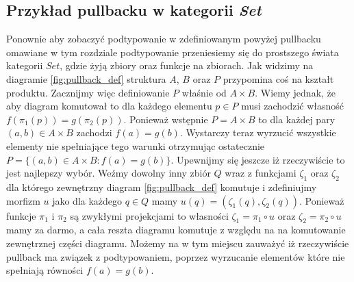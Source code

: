 \subsection{Przykład pullbacku w kategorii \emph{Set}}
Ponownie aby zobaczyć podtypowanie w zdefiniowanym powyżej pullbacku omawiane w tym rozdziale podtypowanie przeniesiemy się do prostszego świata kategorii $Set$, gdzie żyją zbiory oraz funkcje na zbiorach. Jak widzimy na diagramie \ref{fig:pullback_def} struktura $A$, $B$ oraz $P$ przypomina coś na kształt produktu. Zacznijmy więc definiowanie $P$ właśnie od $A \times B$. Wiemy jednak, że aby diagram komutował to dla każdego elementu $p \in P$ musi zachodzić własność $f (\pi_1 (p)) = g (\pi_2(p))$. Ponieważ wstępnie $P = A \times B$ to dla każdej pary $(a, b) \in A \times B$ zachodzi $f(a) = g(b)$. Wystarczy teraz wyrzucić wszystkie elementy nie spełniające tego warunki otrzymując ostatecznie $P = \{(a, b) \in A \times B : f(a) = g(b)\}$. Upewnijmy się jeszcze iż rzeczywiście to jest najlepszy wybór. Weźmy dowolny inny zbiór $Q$ wraz z funkcjami $\zeta_1$ oraz $\zeta_2$ dla którego zewnętrzny diagram \ref{fig:pullback_def} komutuje  i zdefiniujmy morfizm $u$ jako dla każdego $q \in Q$ mamy $u(q) = (\zeta_1(q), \zeta_2(q))$. Ponieważ funkcje $\pi_1$ i $\pi_2$ są zwykłymi projekcjami to własności $\zeta_1 = \pi_1 \circ u$ oraz $\zeta_2 = \pi_2 \circ u$ mamy za darmo, a cała reszta diagramu komutuje z względu na na komutowanie zewnętrznej części diagramu. Możemy na w tym miejscu zauważyć iż rzeczywiście pullback ma związek z podtypowaniem, poprzez wyrzucanie elementów które nie spełniają równości $f(a) = g(b)$.
